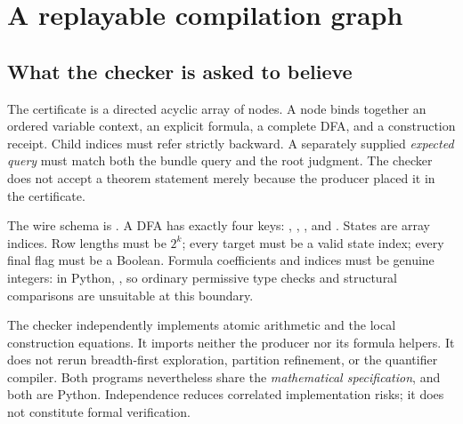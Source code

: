 \section{A replayable compilation graph}\label{sec:certificates}

\subsection{What the checker is asked to believe}
The certificate is a directed acyclic array of nodes. A node binds together an ordered variable context, an explicit formula, a complete DFA, and a construction receipt. Child indices must refer strictly backward. A separately supplied \emph{expected query} must match both the bundle query and the root judgment. The checker does not accept a theorem statement merely because the producer placed it in the certificate.

The wire schema is . A DFA has exactly four keys: , , , and . States are array indices. Row lengths must be \(2^k\); every target must be a valid state index; every final flag must be a Boolean. Formula coefficients and indices must be genuine integers: in Python, , so ordinary permissive type checks and structural comparisons are unsuitable at this boundary.

The checker independently implements atomic arithmetic and the local construction equations. It imports neither the producer nor its formula helpers. It does not rerun breadth-first exploration, partition refinement, or the quantifier compiler. Both programs nevertheless share the \emph{mathematical specification}, and both are Python. Independence reduces correlated implementation risks; it does not constitute formal verification.

